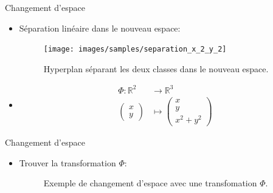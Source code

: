 \documentclass[8pt]{beamer}
\begin{document}
	\begin{frame}{Changement d'espace}
		\begin{itemize}
			\item <1-> Séparation linéaire dans le nouveau espace:
			\begin{figure}[H]
				\texttt{[image: images/samples/separation\_x\_2\_y\_2]}
				\caption*{ Hyperplan séparant les deux classes dans le nouveau espace.}

			\end{figure}
			\item <2-> \begin{align*}
				\Phi: \mathbb{R}^2 &\rightarrow \mathbb{R}^3 \\
				\begin{pmatrix}
					x \\
					y
				\end{pmatrix} &\mapsto \begin{pmatrix}
					x \\
					y \\
					x^2 + y^2
				\end{pmatrix}
			\end{align*}
		\end{itemize}
	\end{frame}
	\begin{frame}{Changement d'espace}
		\begin{itemize}
			\item  Trouver la transformation $\Phi$:
			\begin{figure}[H]
				{
					\caption*{Exemple de changement d'espace avec une transfomation $\Phi$.}
				}
			\end{figure}
		\end{itemize}
	\end{frame}
\end{document}
